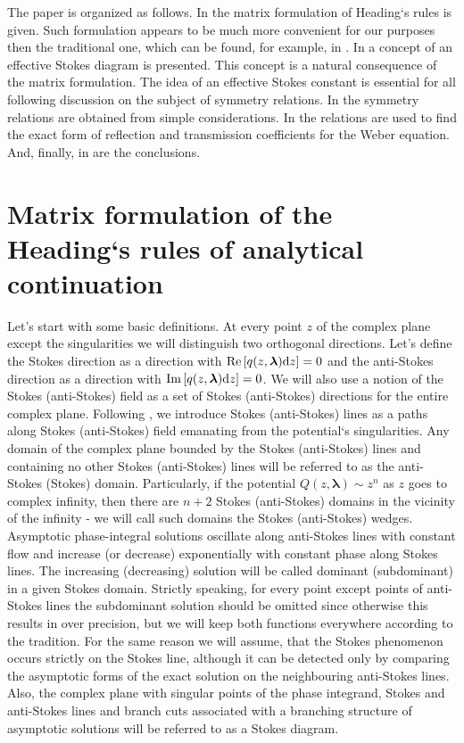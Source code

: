 \documentclass[12pt]{iopart}
\def\lmbd{\bm{\lambda}}
\def\Re{\mathrm{Re}}
\def\Im{\mathrm{Im}}
\newcommand\phsintgrnd[1][z]{q(#1,\lmbd)}
\begin{document}
The paper is organized as follows. 
In  the matrix formulation of Heading`s rules is given. Such formulation appears
to be much more convenient for our purposes then the traditional one, which can be found, 
for example, in \cite{white}.
In  a concept of an effective Stokes diagram is presented. This concept is a natural
consequence of the matrix formulation. The idea of an effective Stokes constant is
essential for all following discussion on the subject of symmetry relations.
In  the symmetry relations are obtained from simple considerations. 
In  the relations are used to find the exact form of reflection and 
transmission coefficients for the Weber equation. 
And, finally, in  are the conclusions. 

\section{Matrix formulation of the Heading`s rules of analytical continuation \label{sec:mtrxfrm}}
Let's start with some basic definitions. At every point $z$ of the complex plane except the 
singularities we will distinguish two orthogonal directions. Let's define the Stokes direction 
as a direction with $\Re \left[ \phsintgrnd \rmd z \right]=0$ and the anti-Stokes direction 
as a direction with $\Im \left[ \phsintgrnd \rmd z \right]=0$. We will also use a notion of 
the Stokes (anti-Stokes) field as a set of Stokes (anti-Stokes) directions for the entire 
complex plane. Following \cite{heading, white}, we introduce Stokes (anti-Stokes) lines as a 
paths along Stokes (anti-Stokes) field emanating from the potential`s singularities. 
Any domain of the complex plane bounded by the Stokes (anti-Stokes) lines and containing no other 
Stokes (anti-Stokes) lines will be referred to as the anti-Stokes (Stokes) domain. Particularly, if 
the potential $Q(z,\lmbd) \sim z^n$ as $z$ goes to complex infinity, then there are $n+2$ Stokes 
(anti-Stokes) domains in the vicinity of the infinity - we will call such domains the Stokes 
(anti-Stokes) wedges. Asymptotic phase-integral solutions  oscillate along anti-Stokes 
lines with constant flow and increase (or decrease) exponentially with constant phase along Stokes lines. 
The increasing (decreasing) solution will be called dominant (subdominant) in a given Stokes domain. 
Strictly speaking, for every point except points of anti-Stokes lines the subdominant solution 
should be omitted since otherwise this results in over precision, but we will keep both functions 
everywhere according to the tradition. For the same reason we will assume, that the Stokes phenomenon 
occurs strictly on the Stokes line, although it can be detected only by comparing the asymptotic forms 
of the exact solution on the neighbouring anti-Stokes lines. Also, the complex plane with singular points
of the phase integrand, Stokes and anti-Stokes lines and branch cuts associated with a 
branching structure of asymptotic solutions  will be referred to as a Stokes diagram.
\end{document}
